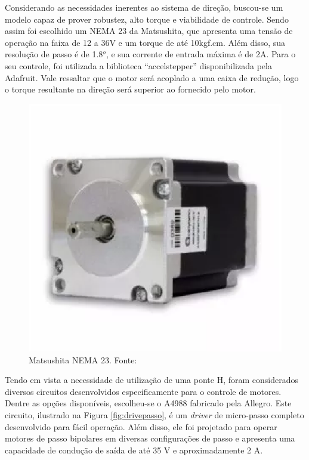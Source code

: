    Considerando as necessidades inerentes ao sistema de direção, buscou-se um modelo capaz de prover robustez, alto torque e viabilidade de controle. Sendo assim foi escolhido um NEMA 23 da Matsushita, que apresenta uma tensão de operação na faixa de 12 a 36V e um torque de até 10kgf.cm. Além disso, sua resolução de passo é de 1.8$^o$, e sua corrente de entrada máxima é de 2A. Para o seu controle, foi utilizada a biblioteca “accelstepper” disponibilizada pela Adafruit. Vale ressaltar que o motor será acoplado a uma caixa de redução, logo o torque resultante na direção será superior ao fornecido pelo motor. 
    
            \begin{figure}[h]
            	\centering
            	\includegraphics[keepaspectratio=true, scale=1]{figuras/matsu.eps}
            	\caption{Matsushita NEMA 23. Fonte: \cite{bde}}
            	\label{fig:matsu}
            \end{figure}
    
    Tendo em vista a necessidade de utilização de uma ponte H, foram considerados diversos circuitos desenvolvidos especificamente para o controle de motores. Dentre as opções disponíveis, escolheu-se o A4988 fabricado pela Allegro. Este circuito, ilustrado na Figura \ref{fig:drivepasso}, é um \textit{driver} de micro-passo completo desenvolvido para fácil operação. Além disso, ele foi projetado para operar motores de passo bipolares em diversas configurações de passo e apresenta uma capacidade de condução de saída de até 35 V e aproximadamente 2 A.
    
